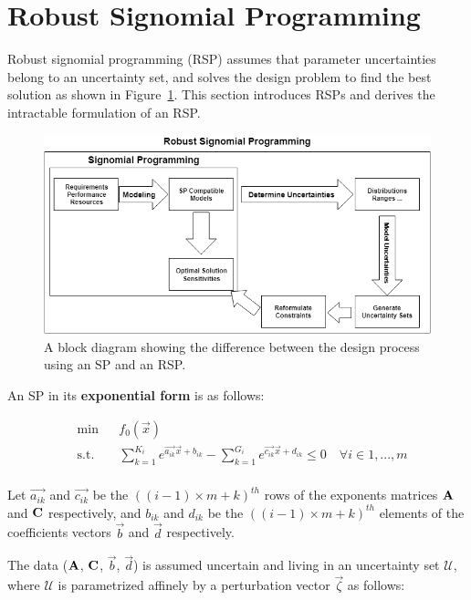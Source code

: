 \section{Robust Signomial Programming} \label{RSP}
Robust signomial programming (RSP) assumes that parameter uncertainties belong to an uncertainty set, and solves the design problem to find the best solution
as shown in Figure~\ref{block_diag}. This section introduces RSPs and derives the intractable formulation of an RSP.

\begin{figure}[h]
	\centering
	\includegraphics{figures/RSP_Diagram.png}
	\caption{A block diagram showing the difference between the design process using an SP and an RSP.}
	\label{block_diag}
\end{figure}

An SP in its \textbf{exponential form} is as follows:

\begin{equation}
    \label{SP_exponential}
\begin{aligned}
	& \min && f_0\left(\vec{x}\right) \\
	& \text{s.t.} && \textstyle{\sum}_{k=1}^{K_i}e^{\vec{a_{ik}}\vec{x} + b_{ik}} - \textstyle{\sum}_{k=1}^{G_i}e^{\vec{c_{ik}}\vec{x} + d_{ik}} \leq 0 \quad \forall i \in 1,...,m\\
\end{aligned}
\end{equation}

Let $\vec{a_{ik}}$ and $\vec{c_{ik}}$ be the $((i-1)\times m + k)^{th}$ rows of the exponents matrices $\mathbf{A}$ and $\mathbf{C}$ respectively, and $b_{ik}$ and $d_{ik}$ be the $((i-1)\times m + k)^{th}$ elements of the coefficients vectors $\vec{b}$ and $\vec{d}$ respectively.

The data ($\mathbf{A}$, $\mathbf{C}$, $\vec{b}$, $\vec{d}$) is assumed uncertain and living in an uncertainty set $\mathcal{U}$, where $\mathcal{U}$ is parametrized affinely by a perturbation vector $\vec{\zeta}$ as follows:

